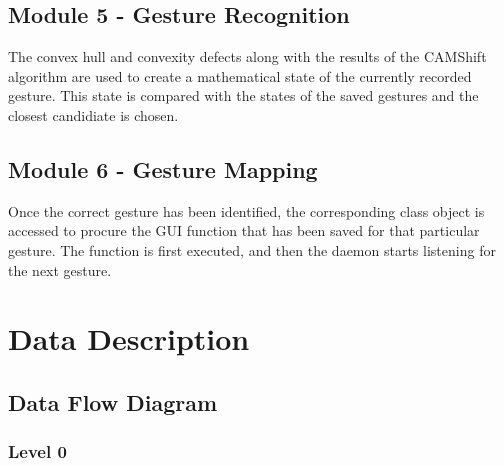 \documentclass{scrreprt}
\begin{document}
\section{Module 5 - Gesture Recognition}
The convex hull and convexity defects along with the results of the CAMShift algorithm are used to create a mathematical state of the currently recorded gesture. This state is compared with the states of the saved gestures and the closest candidiate is chosen.

\section{Module 6 - Gesture Mapping}
Once the correct gesture has been identified, the corresponding class object is accessed to procure the GUI function that has been saved for that particular gesture. The function is first executed, and then the daemon starts listening for the next gesture.

\chapter{Data Description}

\section{Data Flow Diagram}

\subsection{Level 0}
\\
\end{document}
